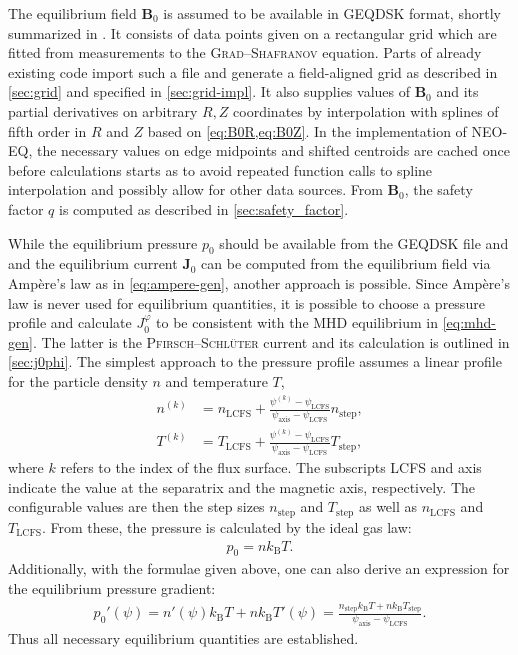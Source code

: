 \documentclass[a4paper, twoside, 10pt, english]{article}
\numberwithin{equation}{section}
\let\temp\varrho
\let\varrho\rho
\let\rho\temp
\let\temp\vartheta
\let\vartheta\theta
\let\theta\temp
\let\temp\varphi
\let\varphi\phi
\let\phi\temp
\let\vec\symbf
\begin{document}
The equilibrium field $\vec{B}_{0}$ is assumed to be available in GEQDSK format, shortly summarized in \cite{Lao97}. It consists of data points given on a rectangular grid which are fitted from measurements to the \textsc{Grad}--\textsc{Shafranov} equation. Parts of already existing code import such a file and generate a field-aligned grid as described in \cref{sec:grid} and specified in \cref{sec:grid-impl}. It also supplies values of $\vec{B}_{0}$ and its partial derivatives on arbitrary $R, Z$ coordinates by interpolation with splines of fifth order in $R$ and $Z$ based on \cref{eq:B0R,eq:B0Z}. In the implementation of NEO-EQ, the necessary values on edge midpoints and shifted centroids are cached once before calculations starts as to avoid repeated function calls to spline interpolation and possibly allow for other data sources. From $\vec{B}_{0}$, the safety factor $q$ is computed as described in \cref{sec:safety_factor}.

While the equilibrium pressure $p_{0}$ should be available from the GEQDSK file and and the equilibrium current $\vec{J}_{0}$ can be computed from the equilibrium field via Ampère's law as in \cref{eq:ampere-gen}, another approach is possible. Since Ampère's law is never used for equilibrium quantities, it is possible to choose a pressure profile and calculate $J_0^{\phi}$ to be consistent with the MHD equilibrium in \cref{eq:mhd-gen}. The latter is the \textsc{Pfirsch}--\textsc{Schlüter} current and its calculation is outlined in \cref{sec:j0phi}. The simplest approach to the pressure profile assumes a linear profile for the particle density $n$ and temperature $T$,
\begin{align}
  n^{(k)} &= n_{\text{LCFS}} + \frac{\psi^{(k)} - \psi_{\text{LCFS}}}{\psi_{\text{axis}} - \psi_{\text{LCFS}}} n_{\text{step}}, \label{eq:dens} \\
  T^{(k)} &= T_{\text{LCFS}} + \frac{\psi^{(k)} - \psi_{\text{LCFS}}}{\psi_{\text{axis}} - \psi_{\text{LCFS}}} T_{\text{step}}, \label{eq:temp}
\end{align}
where $k$ refers to the index of the flux surface. The subscripts LCFS and axis indicate the value at the separatrix and the magnetic axis, respectively. The configurable values are then the step sizes $n_{\text{step}}$ and $T_{\text{step}}$ as well as $n_{\text{LCFS}}$ and $T_{\text{LCFS}}$. From these, the pressure is calculated by the ideal gas law:
\begin{gather}
  p_{0} = n k_{\text{B}} T.
\end{gather}
Additionally, with the formulae given above, one can also derive an expression for the equilibrium pressure gradient:
\begin{gather}
  p_{0}' (\psi) = n' (\psi) k_{\text{B}} T + n k_{\text{B}} T' (\psi) = \frac{n_{\text{step}} k_{\text{B}} T + n k_{\text{B}} T_{\text{step}}}{\psi_{\text{axis}} - \psi_{\text{LCFS}}}.
\end{gather}
Thus all necessary equilibrium quantities are established.
\end{document}
